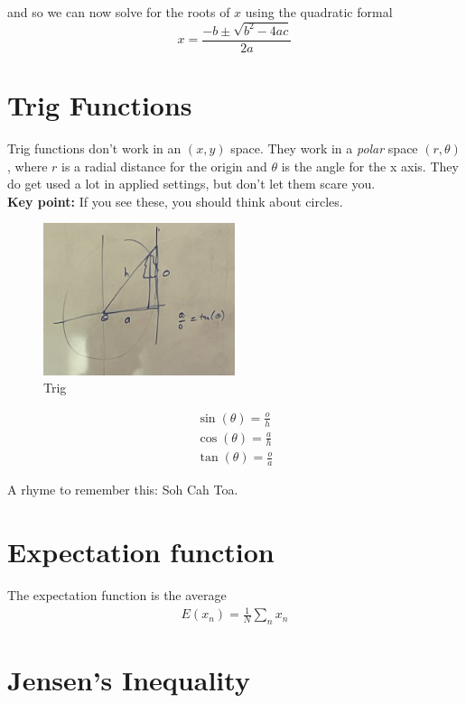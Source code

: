 \documentclass{article}
\begin{document}
and so we can now solve for the roots of $x$ using the quadratic formal  
\[x = \frac{-b \pm \sqrt{b^2 - 4ac}}{2a}\]


\section{Trig Functions}

Trig functions don't work in an $(x,y)$ space. They work in a \textit{polar} space $(r, \theta)$, where $r$ is a radial distance for the origin and $\theta$ is the angle for the x axis.  They do get used a lot in applied settings, but don't let them scare you. \\

\textbf{Key point:} If you see these, you should think about circles. 

\begin{figure}[htp]
    \centering
        \includegraphics[width=0.5\textwidth]{Screen Shot 2023-09-06 at 11.29.46 AM.png}
    \caption{Trig}
\end{figure}

\begin{align}
    \sin(\theta) = \frac{o}{h}\\
    \cos(\theta) = \frac{a}{h} \\
    \tan(\theta) = \frac{o}{a}
\end{align}

A rhyme to remember this: Soh Cah Toa. 

\section{Expectation function}
The expectation function is the average
\begin{align}
    E(x_n) = \frac{1}{N} \sum_n x_n
\end{align}


\section{Jensen's Inequality}
\end{document}

